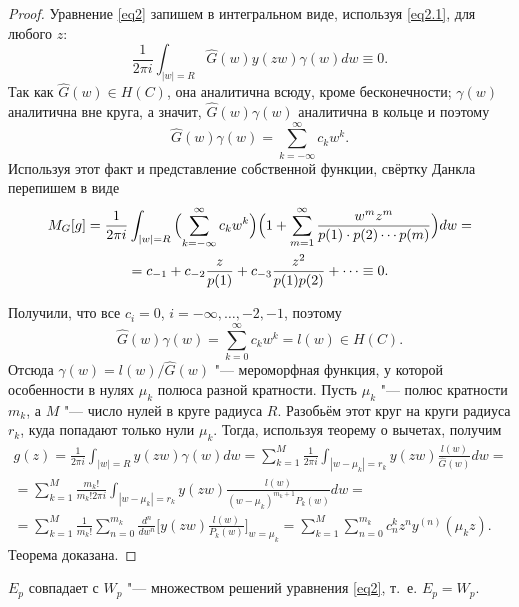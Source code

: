 \begin{proof} Уравнение \eqref{eq2} запишем в интегральном виде, используя \eqref{eq2.1}, для любого $z$: 
$$
\frac1{2\pi i}\int_{|w|=R} {\hat G(w)y(zw)\gamma (w)dw}\equiv 0.
$$ 
Так как 
$\hat G(w)\in H(C)$, она аналитична всюду, кроме бесконечности;
$\gamma(w)$ аналитична вне круга, а  значит, $\hat G(w)\gamma (w)$ аналитична в кольце и поэтому  $$\hat G(w)\gamma (w)=\sum\limits_{k=-\infty}^{\infty} {c_kw^k}.$$ 
Используя этот факт и представление собственной функции, свёртку Данкла перепишем в виде 
\begin{multline*}
M_G[g]=\frac 1{2\pi i}\int_{|w|=R} {\Bigl (\sum\limits_{k=-\infty}^{\infty} {c_kw^k}\Bigr )\Bigl (1+\sum\limits^{\infty}_{m=1} \frac{w^m z^m }{p(1)\cdot p(2)\cdots p(m)}\Bigr )dw}=
\\
=c_{-1}+c_{-2}\frac z {p(1)}+c_{-3}\frac {z^2} {p(1)p(2)}+\cdots \equiv 0.
\end{multline*} 

\pagebreak

\noindent
Получили, что все $c_i=0$, $i={-\infty , \dots, -2,  -1}$, поэтому 
$$\hat G(w)\gamma (w)=\sum \limits_{k=0}^{\infty}c_kw^k=l(w) \in H(C).$$ 
Отсюда $\gamma(w)={l(w)}/{\hat G(w)}$ "--- мероморфная функция, у которой особенности в нулях $\mu_k$ полюса разной кратности. 
Пусть $\mu_k$ "--- полюс кратности $m_k$, а $M$ "--- число нулей в круге радиуса $R$. Разобьём этот круг на круги радиуса $r_k$, куда попадают только нули $\mu_k$. Тогда, используя теорему о вычетах, получим 
\begin{multline*}
g(z)=\frac1{2\pi i}\int_{|w|=R} {y(zw)\gamma (w)dw}=\sum \limits_{k=1}^M {\frac1{2\pi i}\int_{|w-\mu_k|=r_k} {y(zw) \frac {l(w)}{\hat G(w)} dw}}=
\\
=\sum \limits_{k=1}^M {\frac {m_k!}{m_k! 2\pi i}\int_{|w-\mu_k|=r_k} {y(zw) \frac {l(w)}{(w-\mu_k)^{m_k+1}P_k(w)} dw}}=
\\
= \sum \limits_{k=1}^M \frac1{m_k!}\sum\limits_{n=0}^{m_k} \frac {d^n}{dw^n}\biggl [{y(zw) \frac {l(w)}{P_k(w)}}\biggr]_{w=\mu_k}=\sum \limits_{k=1}^{M} \sum \limits_{n=0}^{m_k}c_n^k z^n y^{(n)}(\mu_k z).
\end{multline*} 
Теорема доказана.
\end{proof}

\smallskip

\begin{theorem}[4]$E_p$ совпадает с $W_p$ "--- множеством решений уравнения \eqref{eq2}{\rm ,}  т{\rm .}~е{\rm .} $E_p=W_p.$\end{theorem}

